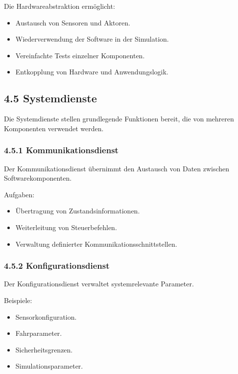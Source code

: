 \documentclass[
]{article}
\providecommand{\tightlist}{%
  \setlength{\itemsep}{0pt}\setlength{\parskip}{0pt}}
\begin{document}
Die Hardwareabstraktion ermöglicht:

\begin{itemize}
\tightlist
\item
  Austausch von Sensoren und Aktoren.
\item
  Wiederverwendung der Software in der Simulation.
\item
  Vereinfachte Tests einzelner Komponenten.
\item
  Entkopplung von Hardware und Anwendungslogik.
\end{itemize}

\subsection{4.5 Systemdienste}\label{systemdienste}

Die Systemdienste stellen grundlegende Funktionen bereit, die von
mehreren Komponenten verwendet werden.

\subsubsection{4.5.1 Kommunikationsdienst}\label{kommunikationsdienst}

Der Kommunikationsdienst übernimmt den Austausch von Daten zwischen
Softwarekomponenten.

Aufgaben:

\begin{itemize}
\tightlist
\item
  Übertragung von Zustandsinformationen.
\item
  Weiterleitung von Steuerbefehlen.
\item
  Verwaltung definierter Kommunikationsschnittstellen.
\end{itemize}

\subsubsection{4.5.2 Konfigurationsdienst}\label{konfigurationsdienst}

Der Konfigurationsdienst verwaltet systemrelevante Parameter.

Beispiele:

\begin{itemize}
\tightlist
\item
  Sensorkonfiguration.
\item
  Fahrparameter.
\item
  Sicherheitsgrenzen.
\item
  Simulationsparameter.
\end{itemize}
\end{document}
